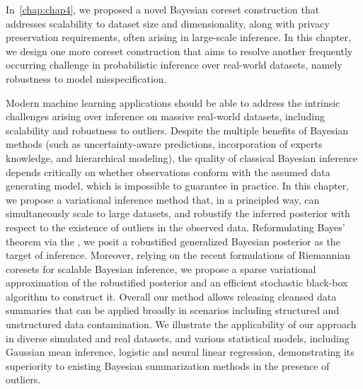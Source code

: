 {
	In~\cref{chap:chap4}, we proposed a novel Bayesian coreset construction that addresses scalability to dataset size and dimensionality, along with privacy preservation requirements, often arising in large-scale inference. In this chapter, we design one more coreset construction that aims to resolve another frequently occurring challenge in probabilistic inference over real-world datasets, namely robustness to model misspecification.
	
	Modern machine learning applications should be able to address the intrinsic challenges arising over inference on massive real-world datasets, including scalability and robustness to outliers. Despite the multiple benefits of Bayesian methods (such as uncertainty-aware predictions, incorporation of experts knowledge, and hierarchical modeling), the quality of classical Bayesian inference depends critically on whether observations conform with the assumed data generating model, which is impossible to guarantee in practice. In this chapter, we propose a variational inference method that, in a principled way, can simultaneously scale to large datasets, and robustify the inferred posterior with respect to the existence of outliers in the observed data. Reformulating Bayes' theorem via the \bdiv, we posit a robustified generalized Bayesian posterior as the target of inference. Moreover, relying on the recent formulations of Riemannian coresets for scalable Bayesian inference, we propose a sparse variational approximation of the robustified posterior and an efficient stochastic black-box algorithm to construct it. Overall our method allows releasing cleansed data summaries  that can be applied broadly in scenarios including structured and unstructured data contamination. We illustrate the applicability of our approach in diverse simulated and real datasets, and various statistical models, including Gaussian mean inference, logistic and neural linear regression, demonstrating its superiority to existing Bayesian summarization methods in the presence of outliers. 
}
